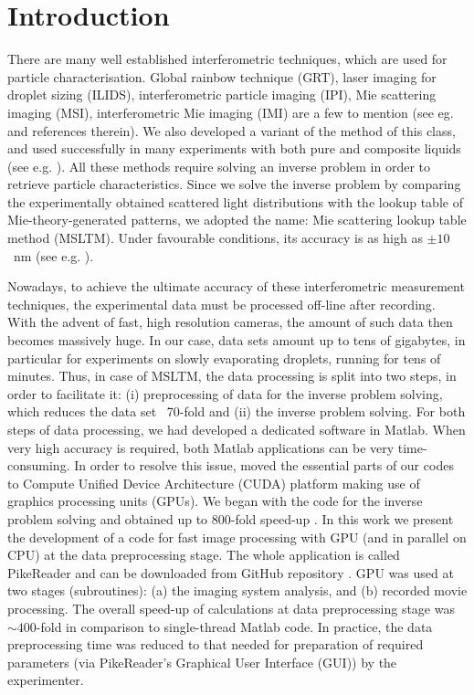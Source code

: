 \documentclass[preprint,review,12pt,dvips]{elsarticle}
\begin{document}
\section{Introduction}
        There are many well established interferometric techniques, which are used for particle characterisation. Global
    rainbow technique (GRT), laser imaging for droplet sizing (ILIDS), interferometric particle imaging (IPI), Mie scattering
    imaging (MSI), interferometric Mie imaging (IMI) are a few to mention (see eg. \cite{Dehaeck} and references therein).
    We also developed a variant of the method of this class, and used successfully in many experiments with both pure and composite liquids (see
    e.g. \cite{N2andAir,liquids,RoP,weightvsscatt,Hi-precission}). All these methods require solving an inverse problem in
    order to retrieve particle characteristics. Since we solve the inverse problem by comparing the experimentally obtained
    scattered light distributions with the lookup table of Mie-theory-generated patterns, we adopted the name: Mie scattering
    lookup table method (MSLTM). Under favourable conditions, its accuracy is as high as $\pm 10$~nm (see e.g.
    \cite{Hi-precission}).

    Nowadays, to achieve the ultimate accuracy of these interferometric measurement techniques, the experimental data must be processed
    off-line after recording. With the advent of fast, high resolution cameras, the amount of such data then becomes massively huge.
    In our case, data sets amount up to tens of gigabytes, in particular for experiments on slowly evaporating droplets, running for tens
    of minutes. Thus, in case of MSLTM, the data processing is split into two steps, in order to facilitate it: (i)
    preprocessing of data for the inverse problem solving, which reduces the data set ~70-fold and (ii) the inverse
    problem solving. For both steps of data processing, we had developed a dedicated software in Matlab. When very high accuracy is required,
    both Matlab applications can be very time-consuming. In order to resolve this issue, moved the essential parts of our codes
    to Compute Unified Device Architecture (CUDA) platform making use of graphics processing units (GPUs). We began with the
    code for the inverse problem solving and obtained up to 800-fold speed-up \cite{Smigacz}. In this work we present the
    development of a code for fast image processing with GPU (and in parallel on CPU) at the data preprocessing stage. The
    whole application is called PikeReader and can be downloaded from GitHub repository \cite{PikeReader}. GPU was used at two
    stages (subroutines): (a) the imaging system analysis, and (b) recorded movie processing. The overall speed-up of
    calculations at data preprocessing stage was $\sim 400$-fold in comparison to single-thread Matlab code. In practice, the
    data preprocessing time was reduced to that needed for preparation of required parameters (via PikeReader's Graphical User
    Interface (GUI)) by the experimenter.
\end{document}
